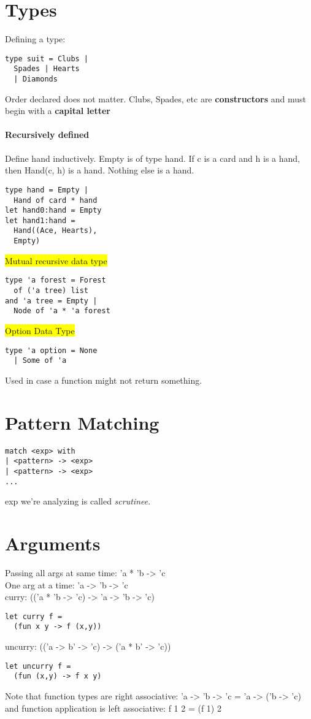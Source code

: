 \color{OliveGreen}
\section{Types}
Defining a type:
\begin{lstlisting}
type suit = Clubs |
  Spades | Hearts
  | Diamonds
\end{lstlisting}
Order declared does not matter. Clubs, Spades, etc are \textbf{constructors}
and must begin with a \textbf{capital letter}
\paragraph{Recursively defined}
Define hand inductively. Empty is of type hand. If c is a card and h
is a hand, then Hand(c, h) is a hand. Nothing else is a hand.
\begin{lstlisting}
type hand = Empty |
  Hand of card * hand
let hand0:hand = Empty
let hand1:hand =
  Hand((Ace, Hearts),
  Empty)
\end{lstlisting}
\colorbox{Yellow}{Mutual recursive data type}
\begin{lstlisting}
type 'a forest = Forest
  of ('a tree) list
and 'a tree = Empty |
  Node of 'a * 'a forest
\end{lstlisting}
\colorbox{Yellow}{Option Data Type}
\begin{lstlisting}
type 'a option = None
  | Some of 'a
\end{lstlisting}
Used in case a function might not return something.
\color{Cyan}
\section{Pattern Matching}
\begin{lstlisting}
match <exp> with
| <pattern> -> <exp>
| <pattern> -> <exp>
...
\end{lstlisting}
exp we're analyzing is called \textit{scrutinee}.
\color{Orange}
\section{Arguments}
Passing all args at same time: 'a * 'b -> 'c
\\ One arg at a time: 'a -> 'b -> 'c
\\curry: (('a * 'b -> 'c) -> 'a -> 'b -> 'c)
\begin{lstlisting}
let curry f =
  (fun x y -> f (x,y))
\end{lstlisting}
uncurry: (('a -> b' -> 'c) -> ('a * b' -> 'c))
\begin{lstlisting}
let uncurry f =
  (fun (x,y) -> f x y)
\end{lstlisting}
Note that function types are right associative: 'a -> 'b -> 'c = 'a ->
('b -> 'c) and function application is left associative: f 1 2 = (f 1) 2
\color{Magenta}
